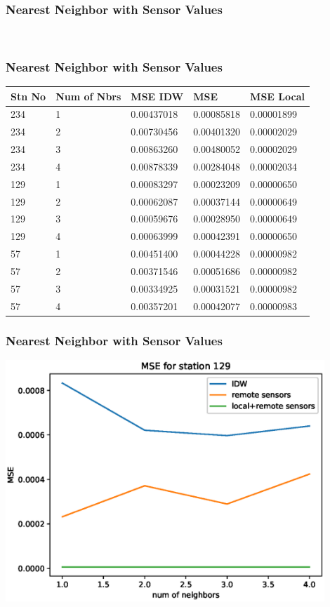\begin{frame}
\frametitle{Nearest Neighbor with Sensor Values}
~\\
\end{frame}

\begin{frame}
\frametitle{Nearest Neighbor with Sensor Values \continued}
\centering
\begin{tabular}{|l|l|l|l|l|}
\hline
	\textbf{Stn No} & \textbf{Num of Nbrs} & \textbf{MSE IDW} & \textbf{MSE} &\textbf{MSE Local}\\
\hline
234 & 1 & 0.00437018 & 0.00085818 & 0.00001899\\
\hline
234 & 2 & 0.00730456 & 0.00401320 & 0.00002029\\
\hline
234 & 3 & 0.00863260 & 0.00480052 & 0.00002029\\
\hline
234 & 4 & 0.00878339 & 0.00284048 & 0.00002034\\
\hline
129 & 1 & 0.00083297 & 0.00023209 & 0.00000650\\
\hline
129 & 2 & 0.00062087 & 0.00037144 & 0.00000649\\
\hline
129 & 3 & 0.00059676 & 0.00028950 & 0.00000649\\
\hline
129 & 4 & 0.00063999 & 0.00042391 & 0.00000650\\
\hline
57 & 1 & 0.00451400 & 0.00044228 & 0.00000982\\
\hline
57 & 2 & 0.00371546 & 0.00051686 & 0.00000982\\
\hline
57 & 3 & 0.00334925 & 0.00031521 & 0.00000982\\
\hline
57 & 4 & 0.00357201 & 0.00042077 & 0.00000983\\
\hline
\end{tabular}
\end{frame}

\begin{frame}
\frametitle{Nearest Neighbor with Sensor Values \continued}
\centering
\includegraphics[width=0.9\textwidth]{images/129-idw-local-remote}
\end{frame}

